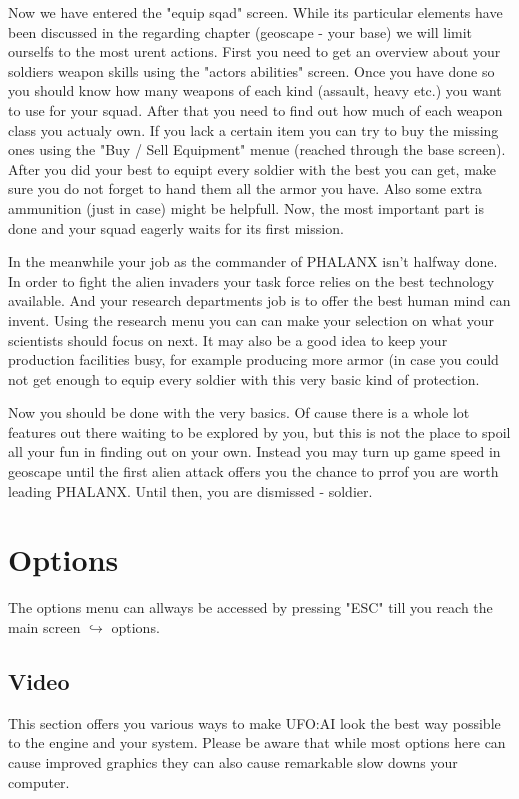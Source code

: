 Now we have entered the "equip sqad" screen. While its particular elements have been discussed in the regarding chapter (geoscape - your base) we will limit ourselfs to the most urent actions. First you need to get an overview about your soldiers weapon skills using the "actors abilities" screen. Once you have done so you should know how many weapons of each kind (assault, heavy etc.) you want to use for your squad. After that you need to find out how much of each weapon class you actualy own. If you lack a certain item you can try to buy the missing ones using the "Buy / Sell Equipment" menue (reached through the base screen). After you did your best to equipt every soldier with the best you can get, make sure you do not forget to hand them all the armor you have. Also some extra ammunition (just in case) might be helpfull. Now, the most important part is done and your squad eagerly waits for its first mission.

In the meanwhile your job as the commander of PHALANX isn't halfway done. In order to fight the alien invaders your task force relies on the best technology available. And your research departments job is to offer the best human mind can invent. Using the research menu you can can make your selection on what your scientists should focus on next. It may also be a good idea to keep your production facilities busy, for example producing more armor (in case you could not get enough to equip every soldier with this very basic kind of protection.

Now you should be done with the very basics. Of cause there is a whole lot features out there waiting to be explored by you, but this is not the place to spoil all your fun in finding out on your own. Instead you may turn up game speed in geoscape until the first alien attack offers you the chance to prrof you are worth leading PHALANX. Until then, you are dismissed - soldier.

\section{Options}
The options menu can allways be accessed by pressing "ESC" till you reach the main screen $\hookrightarrow$ options.

\subsection{Video}
This section offers you various ways to make UFO:AI look the best way possible to the engine and your system. Please be aware that while most options here can cause improved graphics they can also cause remarkable slow downs your computer.
